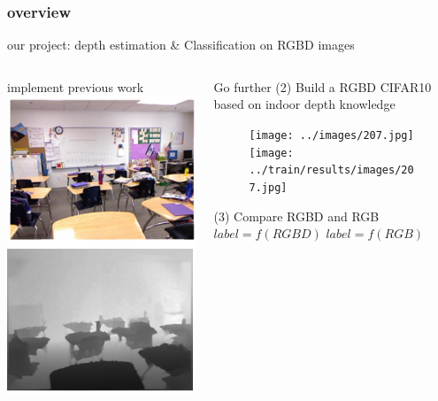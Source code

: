 \documentclass{beamer}
\begin{document}
\begin{frame}
\frametitle{overview}
\begin{alertblock}{our project: depth estimation \& Classification on RGBD images}
\begin{columns}
\begin{column}{.37\textwidth}
\begin{block}{implement previous work}
\includegraphics[width=\linewidth]{im2d.png}
\end{block}
\end{column}
\begin{column}{.44\textwidth}
\begin{exampleblock}{Go further}
(2) Build a RGBD CIFAR10 based on indoor depth knowledge\\
\begin{figure}
\texttt{[image: ../images/207.jpg]}
\texttt{[image: ../train/results/images/207.jpg]}
\end{figure}
(3) Compare RGBD and RGB\\
$label=f(RGBD)$
$label=f(RGB)$
\end{exampleblock}
\end{column}
\end{columns}
\end{alertblock}
\end{frame}
\end{document}
